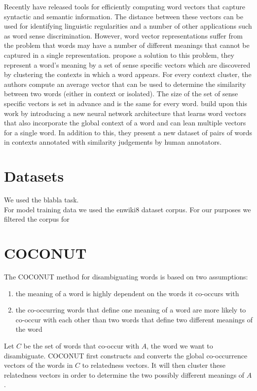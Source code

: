 \documentclass[11pt]{article}
\begin{document}
Recently \cite{word2vec} have released tools for efficiently computing word vectors that capture syntactic and semantic information. The distance between these vectors can be used for identifying linguistic regularities \cite{regularities} and a number of other applications such as word sense discrimination. However, word vector representations suffer from the problem that words may have a number of different meanings that cannot be captured in a single representation. \cite{multi} propose a solution to this problem, they represent a word's meaning by a set of sense specific vectors which are discovered by clustering the contexts in which a word appears. For every context cluster, the authors compute an average vector that can be used to determine the similarity between two words (either in context or isolated). The size of the set of sense specific vectors is set in advance and is the same for every word. \cite{global} build upon this work by introducing a new neural network architecture that learns word vectors that also incorporate the global context of a word and can lean multiple vectors for a single word. In addition to this, they present a new dataset of pairs of words in contexts annotated with similarity judgements by human annotators. 

\section{Datasets}
We used the blabla task.\\
For model training data we used the enwiki8 dataset \cite{enwiki} corpus. For our purposes we filtered the corpus for 

\section{COCONUT}
The COCONUT method for disambiguating words is based on two assumptions: 
\begin{enumerate}
\item the meaning of a word is highly dependent on the words it co-occurs with
\item the co-occurring words that define one meaning of a word are more likely to co-occur with each other than two words that define two different meanings of the word
\end{enumerate}

Let $C$ be the set of words that co-occur with $A$, the word we want to disambiguate. COCONUT first constructs and converts the global co-occurrence vectors of the words in $C$ to relatedness vectors. It will then cluster these relatedness vectors in order to determine the two possibly different meanings of $A$. 
\end{document}
